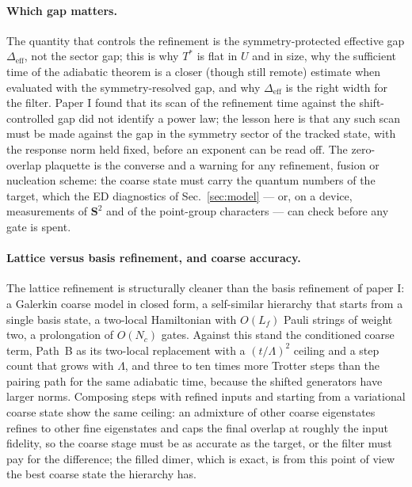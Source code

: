 \documentclass[a4paper,11pt,noarxiv]{quantumarticle}
\newcommand{\Deff}{\Delta_{\mathrm{eff}}}
\begin{document}
\paragraph{Which gap matters.}
The quantity that controls the refinement is the symmetry-protected
effective gap $\Deff$, not the sector gap; this is why $T^*$ is flat in $U$
and in size, why the sufficient time of the adiabatic theorem is a closer
(though still remote) estimate when evaluated with the symmetry-resolved
gap, and why $\Deff$ is the right width for the filter.  Paper I found that
its scan of the refinement time against the shift-controlled gap did not
identify a power law; the lesson here is that any such scan must be made
against the gap in the symmetry sector of the tracked state, with the
response norm held fixed, before an exponent can be read off.  The
zero-overlap plaquette is the converse and a warning for any refinement,
fusion or nucleation scheme: the coarse state must carry the quantum
numbers of the target, which the ED diagnostics of Sec.~\ref{sec:model}
--- or, on a device, measurements of $\mathbf S^2$ and of the point-group
characters --- can check before any gate is spent.

\paragraph{Lattice versus basis refinement, and coarse accuracy.}
The lattice refinement is structurally cleaner than the basis refinement
of paper I: a Galerkin coarse model in closed form, a self-similar
hierarchy that starts from a single basis state, a two-local Hamiltonian
with $O(L_f)$ Pauli strings of weight two, a prolongation of $O(N_c)$ gates.
Against this stand the conditioned coarse term, Path~B as its two-local
replacement with a $(t/\Lambda)^2$ ceiling and a step count that grows with
$\Lambda$, and three to ten times more Trotter steps than the pairing path
for the same adiabatic time, because the shifted generators have larger
norms.  Composing steps with refined inputs and starting from a variational
coarse state show the same ceiling: an admixture of other coarse
eigenstates refines to other fine eigenstates and caps the final overlap at
roughly the input fidelity, so the coarse stage must be as accurate as the
target, or the filter must pay for the difference; the filled dimer, which
is exact, is from this point of view the best coarse state the hierarchy
has.
\end{document}
